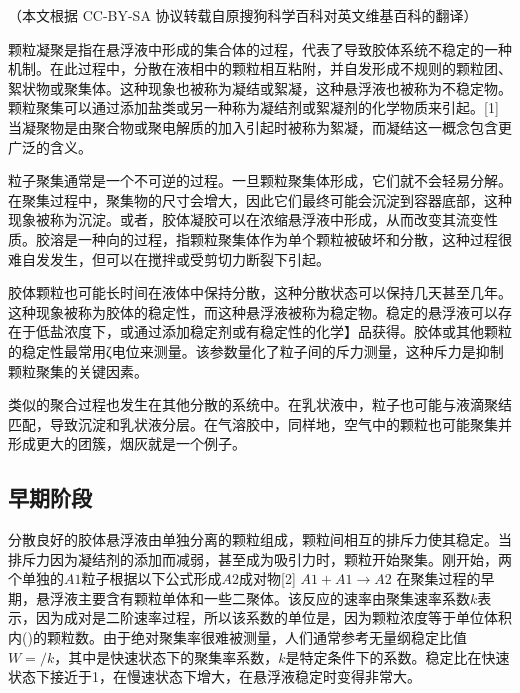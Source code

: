 
（本文根据 CC-BY-SA 协议转载自原搜狗科学百科对英文维基百科的翻译）

颗粒凝聚是指在悬浮液中形成的集合体的过程，代表了导致胶体系统不稳定的一种机制。在此过程中，分散在液相中的颗粒相互粘附，并自发形成不规则的颗粒团、絮状物或聚集体。这种现象也被称为凝结或絮凝，这种悬浮液也被称为不稳定物。颗粒聚集可以通过添加盐类或另一种称为凝结剂或絮凝剂的化学物质来引起。[1] 当凝聚物是由聚合物或聚电解质的加入引起时被称为絮凝，而凝结这一概念包含更广泛的含义。

粒子聚集通常是一个不可逆的过程。一旦颗粒聚集体形成，它们就不会轻易分解。在聚集过程中，聚集物的尺寸会增大，因此它们最终可能会沉淀到容器底部，这种现象被称为沉淀。或者，胶体凝胶可以在浓缩悬浮液中形成，从而改变其流变性质。胶溶是一种向的过程，指颗粒聚集体作为单个颗粒被破坏和分散，这种过程很难自发发生，但可以在搅拌或受剪切力断裂下引起。

胶体颗粒也可能长时间在液体中保持分散，这种分散状态可以保持几天甚至几年。这种现象被称为胶体的稳定性，而这种悬浮液被称为稳定物。稳定的悬浮液可以存在于低盐浓度下，或通过添加稳定剂或有稳定性的化学】品获得。胶体或其他颗粒的稳定性最常用ζ电位来测量。该参数量化了粒子间的斥力测量，这种斥力是抑制颗粒聚集的关键因素。

类似的聚合过程也发生在其他分散的系统中。在乳状液中，粒子也可能与液滴聚结匹配，导致沉淀和乳状液分层。在气溶胶中，同样地，空气中的颗粒也可能聚集并形成更大的团簇，烟灰就是一个例子。

\subsection{早期阶段}
分散良好的胶体悬浮液由单独分离的颗粒组成，颗粒间相互的排斥力使其稳定。当排斥力因为凝结剂的添加而减弱，甚至成为吸引力时，颗粒开始聚集。刚开始，两个单独的$A1$粒子根据以下公式形成$A2$成对物[2]
$A 1 + A 1 \to A 2$
在聚集过程的早期，悬浮液主要含有颗粒单体和一些二聚体。该反应的速率由聚集速率系数$k$表示，因为成对是二阶速率过程，所以该系数的单位是，因为颗粒浓度等于单位体积内()的颗粒数。由于绝对聚集率很难被测量，人们通常参考无量纲稳定比值$W = /k$，其中是快速状态下的聚集率系数，$k$是特定条件下的系数。稳定比在快速状态下接近于1，在慢速状态下增大，在悬浮液稳定时变得非常大。

